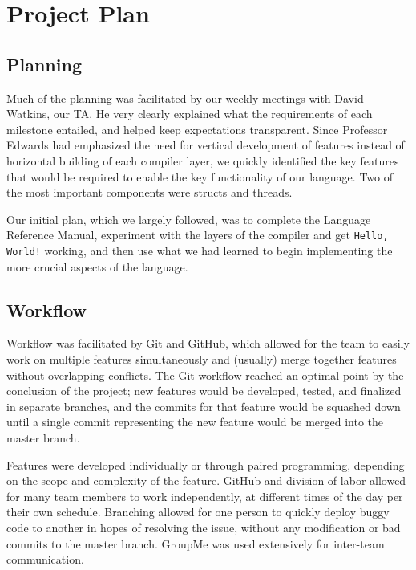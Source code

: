\chapter{Project Plan}
	
\section{Planning}
	Much of the planning was facilitated by our weekly meetings with David Watkins, our TA. He very clearly explained what the requirements of each milestone entailed, and helped keep expectations transparent. Since Professor Edwards had emphasized the need for vertical development of features instead of horizontal building of each compiler layer, we quickly identified the key features that would be required to enable the key functionality of our language. Two of the most important components were structs and threads.

  \medskip \noindent
  Our initial plan, which we largely followed, was to complete the Language Reference Manual, experiment with the layers of the compiler and get \texttt{Hello, World!} working, and then use what we had learned to begin implementing the more crucial aspects of the language.

\section{Workflow}

  Workflow was facilitated by Git and GitHub, which allowed for the team to easily work on multiple features simultaneously and (usually) merge together features without overlapping conflicts. The Git workflow reached an optimal point by the conclusion of the project; new features would be developed, tested, and finalized in separate branches, and the commits for that feature would be squashed down until a single commit representing the new feature would be merged into the master branch.

  \medskip \noindent
  Features were developed individually or through paired programming, depending on the scope and complexity of the feature. GitHub and division of labor allowed for many team members to work independently, at different times of the day per their own schedule. Branching allowed for one person to quickly deploy buggy code to another in hopes of resolving the issue, without any modification or bad commits to the master branch. GroupMe was used extensively for inter-team communication.

